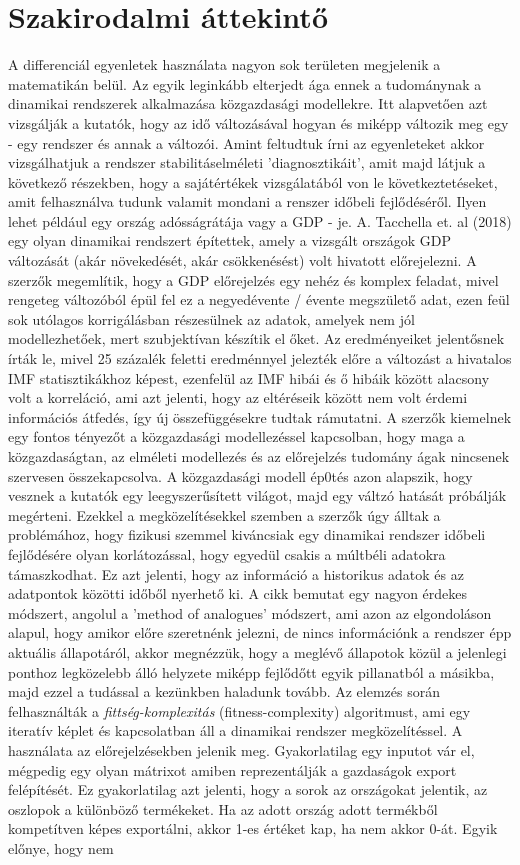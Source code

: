 \documentclass{article}
\theoremstyle{definition}
\theoremstyle{theorem}
\begin{document}
\section{Szakirodalmi áttekintő}
A differenciál egyenletek használata nagyon sok területen megjelenik a matematikán belül. Az egyik leginkább elterjedt ága ennek a tudománynak a dinamikai rendszerek alkalmazása közgazdasági modellekre. Itt alapvetően azt vizsgálják a kutatók, hogy az idő változásával hogyan és miképp változik meg egy - egy rendszer és annak a változói. Amint feltudtuk írni az egyenleteket akkor vizsgálhatjuk a rendszer stabilitáselméleti 'diagnosztikáit', amit majd látjuk a következő részekben, hogy a sajátértékek vizsgálatából von le következtetéseket, amit felhasználva tudunk valamit mondani a renszer időbeli fejlődéséről. Ilyen lehet például egy ország adósságrátája vagy a GDP - je. A. Tacchella et. al (2018) egy olyan dinamikai rendszert építettek, amely a vizsgált országok GDP változását (akár növekedését, akár csökkenésést) volt hivatott előrejelezni. A szerzők megemlítik, hogy a GDP előrejelzés egy nehéz és komplex feladat, mivel rengeteg változóból épül fel ez a negyedévente / évente megszülető adat, ezen feül sok utólagos korrigálásban részesülnek az adatok, amelyek nem jól modellezhetőek, mert szubjektívan készítik el őket. Az eredményeiket jelentősnek írták le, mivel 25 százalék feletti eredménnyel jelezték előre a változást a hivatalos IMF statisztikákhoz képest, ezenfelül az IMF hibái és ő hibáik között alacsony volt a korreláció, ami azt jelenti, hogy az eltéréseik között nem volt érdemi információs átfedés, így új összefüggésekre tudtak rámutatni. A szerzők kiemelnek egy fontos tényezőt a közgazdasági modellezéssel kapcsolban, hogy maga a közgazdaságtan, az elméleti modellezés és az előrejelzés tudomány ágak nincsenek szervesen összekapcsolva. A közgazdasági modell ép0tés azon alapszik, hogy vesznek a kutatók egy leegyszerűsített világot, majd egy váltzó hatását próbálják megérteni. Ezekkel a megközelítésekkel szemben a szerzők úgy álltak a problémához, hogy fizikusi szemmel kiváncsiak egy dinamikai rendszer időbeli fejlődésére olyan korlátozással, hogy egyedül csakis a múltbéli adatokra támaszkodhat. Ez azt jelenti, hogy az információ a historikus adatok és az adatpontok közötti időből nyerhető ki. A cikk bemutat egy nagyon érdekes módszert, angolul a 'method of analogues' módszert, ami azon az elgondoláson alapul, hogy amikor előre szeretnénk jelezni, de nincs információnk a rendszer épp aktuális állapotáról, akkor megnézzük, hogy a meglévő állapotok közül a jelenlegi ponthoz legközelebb álló helyzete miképp fejlődőtt egyik pillanatból a másikba, majd ezzel a tudással a kezünkben haladunk tovább. Az elemzés során felhasználták a \textit{fittség-komplexitás} (fitness-complexity) algoritmust, ami egy iteratív képlet és kapcsolatban áll a dinamikai rendszer megközelítéssel. A használata az előrejelzésekben jelenik meg. Gyakorlatilag egy inputot vár el, mégpedig egy olyan mátrixot amiben reprezentálják a gazdaságok export felépítését. Ez gyakorlatilag azt jelenti, hogy a sorok az országokat jelentik, az oszlopok a különböző termékeket. Ha az adott ország adott termékből kompetítven képes exportálni, akkor 1-es értéket kap, ha nem akkor 0-át. Egyik előnye, hogy nem 
\end{document}
